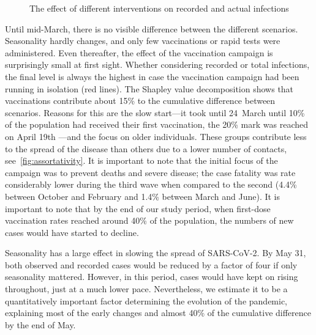 \begin{figure}[!tp]
    \caption{The effect of different interventions on recorded and actual infections}
    \label{fig:2021_scenarios_broad}

\end{figure}

Until mid-March, there is no visible difference between the different scenarios.
Seasonality hardly changes, and only few vaccinations or rapid tests were administered.
Even thereafter, the effect of the vaccination campaign is surprisingly small at first
sight. Whether considering recorded or total infections, the final level is always the
highest in case the vaccination campaign had been running in isolation (red lines). The
Shapley value decomposition shows that vaccinations contribute about
15\% to the cumulative difference between scenarios. Reasons for
this are the slow start---it took until 24~March until 10\% of the population had
received their first vaccination, the 20\% mark was reached on April 19th ---and the
focus on older individuals. These groups contribute less to the spread of the disease
than others due to a lower number of contacts, see~\ref{fig:assortativity}. It is
important to note that the initial focus of the campaign was to prevent deaths and
severe disease; the case fatality was rate considerably lower during the third wave when
compared to the second (4.4\% between October and February and 1.4\% between March and
June). It is important to note that by the end of our study period, when first-dose
vaccination rates reached around 40\% of the population, the numbers of new cases would
have started to decline.

Seasonality has a large effect in slowing the spread of SARS-CoV-2. By May 31, both
observed and recorded cases would be reduced by a factor of four if only seasonality
mattered. However, in this period, cases would have kept on rising throughout, just at a
much lower pace. Nevertheless, we estimate it to be a quantitatively important factor
determining the evolution of the pandemic, explaining most of the early changes and
almost 40\% of the cumulative difference by the end of May.

